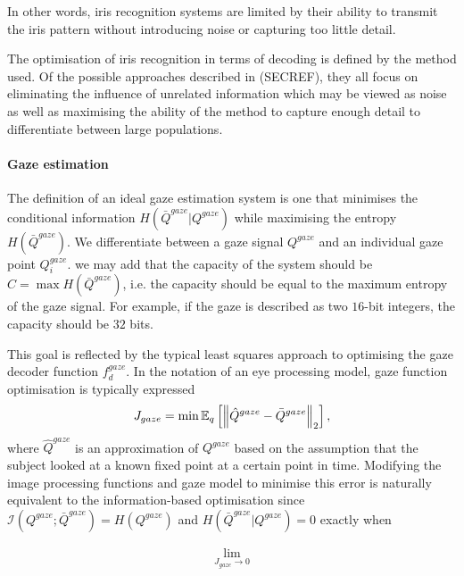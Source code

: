 In other words, iris recognition systems are limited by their ability to transmit the iris pattern without introducing noise or capturing too little detail.

The optimisation of iris recognition in terms of decoding is defined by the method used. Of the possible approaches described in (SECREF), they all focus on eliminating the influence of unrelated information which may be viewed as noise as well as maximising the ability of the method to capture enough detail to differentiate between large populations. 

\paragraph{Gaze estimation}


The definition of an ideal gaze estimation system is one that minimises the conditional information $H(\bar{Q}^{gaze}|Q^{gaze})$ while maximising the entropy $H(\bar{Q}^{gaze})$. We differentiate between a gaze signal $Q^{gaze}$ and an individual gaze point $Q^{gaze}_i$. we may add that the capacity of the system should be $C = \max H(\bar{Q}^{gaze})$, i.e. the capacity should be equal to the maximum entropy of the gaze signal. For example, if the gaze is described as two $16$-bit integers, the capacity should be $32$ bits. 
 

This goal is reflected by the typical least squares approach to optimising the gaze decoder function $f^{gaze}_d$. In the notation of an eye processing model, gaze function optimisation is typically expressed
\begin{align}
    J_{gaze} = \min \mathbb{E}_{q}\left[\left\lVert\hat{Q}^{gaze} - \bar{Q}^{gaze}\right\rVert_2\right],
\end{align}
where $\hat{Q}^{gaze}$ is an approximation of $Q^{gaze}$ based on the assumption that the subject looked at a known fixed point at a certain point in time. Modifying the image processing functions and gaze model to minimise this error is naturally equivalent to the information-based optimisation since $\mathcal{I}(Q^{gaze};\bar{Q}^{gaze})=H(Q^{gaze})$ and $H(\bar{Q}^{gaze}|Q^{gaze})=0$ exactly when 

\begin{align}
	\lim_{J_{gaze}\rightarrow 0}
\end{align}



